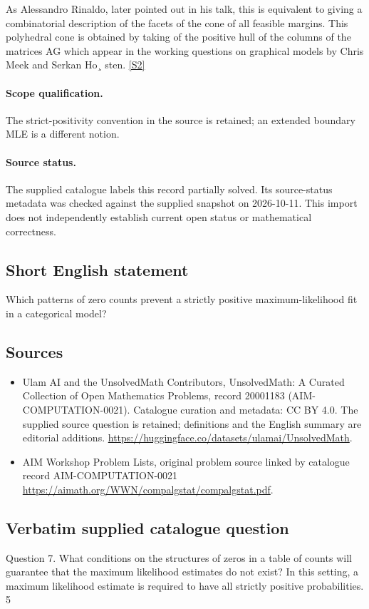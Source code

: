 \documentclass[11pt]{article}
\begin{document}
As Alessandro Rinaldo, later pointed out in his talk, this is equivalent to giving a combinatorial description of the facets of the cone of all feasible margins. This polyhedral cone is obtained by taking of the positive hull of the columns of the matrices AG which appear in the working questions on graphical models by Chris Meek and Serkan Ho¸ sten. \href{https://aimath.org/WWN/compalgstat/compalgstat.pdf}{[S2]}
\paragraph{Scope qualification.}
The strict-positivity convention in the source is retained; an extended boundary MLE is a different notion.
\paragraph{Source status.}
The supplied catalogue labels this record partially solved. Its source-status metadata was checked against the supplied snapshot on 2026-10-11. This import does not independently establish current open status or mathematical correctness.
\subsection{Short English statement}
Which patterns of zero counts prevent a strictly positive maximum-likelihood fit in a categorical model?
\subsection{Sources}
\begin{itemize}
\item[S1] Ulam AI and the UnsolvedMath Contributors, UnsolvedMath: A Curated Collection of Open Mathematics Problems, record 20001183 (AIM-COMPUTATION-0021). Catalogue curation and metadata: CC BY 4.0. The supplied source question is retained; definitions and the English summary are editorial additions.
\url{https://huggingface.co/datasets/ulamai/UnsolvedMath}.
\item[S2] AIM Workshop Problem Lists, original problem source linked by catalogue record AIM-COMPUTATION-0021
\url{https://aimath.org/WWN/compalgstat/compalgstat.pdf}.
\end{itemize}
\subsection{Verbatim supplied catalogue question}
Question 7. What conditions on the structures of zeros in a table of counts will guarantee that the maximum likelihood estimates do not exist? In this setting, a maximum likelihood estimate is required to have all strictly positive probabilities. 5
\end{document}
